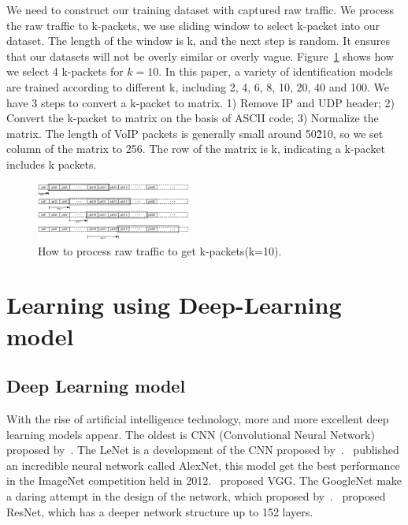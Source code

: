 \documentclass[conference]{IEEEtran}
\begin{document}
We need to construct our training dataset with captured raw traffic. We process the raw traffic to k-packets, we use sliding window to select k-packet into our dataset. The length of the window is k, and the next step is random. It ensures that our datasets will not be overly similar or overly vague. Figure~\ref{fig:dataset} shows how we select 4 k-packets for $k=10$. In this paper, a variety of identification models are trained according to different k, including 2, 4, 6, 8, 10, 20, 40 and 100. We have 3 steps to convert a k-packet to matrix. 1) Remove IP and UDP header; 2) Convert the k-packet to matrix on the basis of ASCII code; 3) Normalize the matrix. The length of VoIP packets is generally small around 50\~210, so we set column of the matrix to 256. The row of the matrix is k, indicating a k-packet includes k packets.

\begin{figure}[htp]
\begin{center}
\includegraphics[width=0.45\textwidth]{dataset.eps}
\caption{How to process raw traffic to get k-packets(k=10).}\label{fig:dataset}
\end{center}
\end{figure}

\section{Learning using Deep-Learning model}
\label{sec:learningusingdeeplearningmodel}
\subsection{Deep Learning model}
With the rise of artificial intelligence technology, more and more excellent deep learning models appear. The oldest is CNN (Convolutional Neural Network) proposed by~\cite{6}. The LeNet is a development of the CNN proposed by~\cite{7}.~\cite{8} published an incredible neural network called AlexNet, this model get the best performance in the ImageNet competition held in 2012.~\cite{9} proposed VGG. The GoogleNet make a daring attempt in the design of the network, which proposed by~\cite{10}.~\cite{11} proposed ResNet, which has a deeper network structure up to 152 layers.
\end{document}
